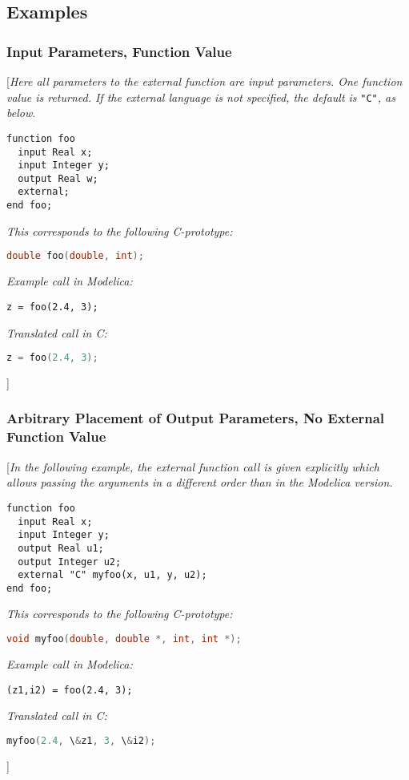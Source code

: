 \subsection{Examples}

\subsubsection{Input Parameters, Function Value}

{[}\emph{Here all parameters to the external function are input
parameters. One function value is returned. If the external language is
not specified, the default is} \lstinline!"C"!\emph{, as below}.

\begin{lstlisting}[language=modelica]
function foo
  input Real x;
  input Integer y;
  output Real w;
  external;
end foo;
\end{lstlisting}
\emph{This corresponds to the following C-prototype:}
\begin{lstlisting}[language=C]
double foo(double, int);
\end{lstlisting}

\emph{Example call in Modelica: }
\begin{lstlisting}[language=modelica]
z = foo(2.4, 3);
\end{lstlisting}
\emph{Translated call in C: }
\begin{lstlisting}[language=C]
z = foo(2.4, 3);
\end{lstlisting}
{]}

\subsubsection{Arbitrary Placement of Output Parameters, No External Function Value}

{[}\emph{In the following example, the external function call is given
explicitly which allows passing the arguments in a different order than
in the Modelica version.}

\begin{lstlisting}[language=modelica]
function foo
  input Real x;
  input Integer y;
  output Real u1;
  output Integer u2;
  external "C" myfoo(x, u1, y, u2);
end foo;
\end{lstlisting}
\emph{This corresponds to the following C-prototype:}
\begin{lstlisting}[language=C]
void myfoo(double, double *, int, int *);
\end{lstlisting}
\emph{Example call in Modelica: }
\begin{lstlisting}[language=modelica]
(z1,i2) = foo(2.4, 3);
\end{lstlisting}
\emph{Translated call in C: }
\begin{lstlisting}[language=C]
myfoo(2.4, \&z1, 3, \&i2);
\end{lstlisting}
{]}

